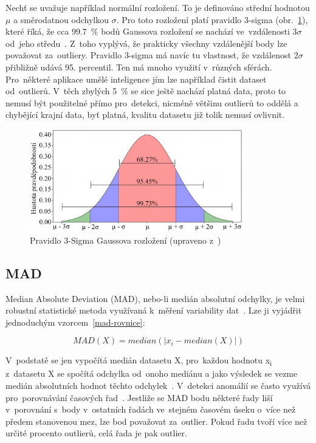 Nechť se uvažuje například normální rozložení. To je definováno střední hodnotou \(\mu\) a směrodatnou odchylkou \(\sigma\). Pro toto rozložení platí pravidlo 3-sigma (obr.~\ref{3-sigma-img}), které říká, že cca 99.7~\% bodů Gaussova rozložení se nachází ve~vzdálenosti \(3\sigma\) od~jeho středu~\cite{3-sigma}. Z~toho vyplývá, že prakticky všechny vzdálenější body lze považovat za~outliery. Pravidlo \mbox{3-sigma} má navíc tu vlastnost, že vzdálenost \(2\sigma\) přibližně udává 95. percentil. Ten má mnoho využití v~různých sférách. Pro~některé aplikace umělé inteligence jím lze například čistit dataset od~outlierů. V~těch zbylých 5~\% se sice ještě nachází platná data, proto to nemusí být použitelné přímo pro~detekci, nicméně většinu outlierů to oddělá a chybějící krajní data, byť platná, kvalitu datasetu již tolik nemusí ovlivnit.

\begin{figure}[hbt]
	\centering
	\includegraphics[width=0.85\textwidth]{obrazky/3-sigma.pdf}
	\caption{Pravidlo 3-Sigma Gaussova rozložení (upraveno z~\cite{3-sigma})}
	\label{3-sigma-img}
\end{figure}

\subsection{MAD}
Median Absolute Deviation (MAD), nebo-li medián absolutní odchylky, je velmi robustní statistické metoda využívaná k~měření variability dat~\cite{mad}. Lze ji vyjádřit jednoduchým vzorcem~\ref{mad-rovnice}:

\begin{equation}
\label{mad-rovnice}
MAD(X) = median({|x_i - median(X)|})
\end{equation}

V~podstatě se jen vypočítá medián datasetu X, pro~každou hodnotu x\textsubscript{i} z~datasetu X se spočítá odchylka od~onoho mediánu a jako výsledek se vezme medián absolutních hodnot těchto odchylek~\cite{mad}. V~detekci anomálií se často využívá pro~porovnávání časových řad~\cite{mad}. Jestliže se MAD bodu některé řady liší v~porovnání s~body v~ostatních řadách ve~stejném časovém úseku o~více než předem stanovenou mez, lze bod považovat za~outlier. Pokud řadu tvoří více než určité procento outlierů, celá řada je pak outlier.

